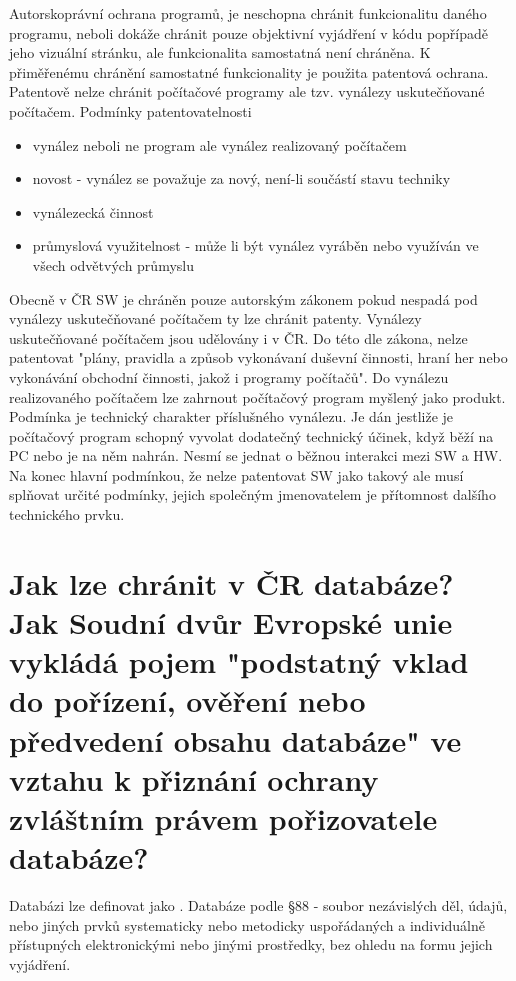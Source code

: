 Autorskoprávní ochrana programů, je neschopna chránit funkcionalitu daného programu, neboli dokáže chránit pouze objektivní vyjádření v kódu popřípadě jeho vizuální stránku, ale funkcionalita samostatná není chráněna. K přiměřenému chránění samostatné funkcionality je použita patentová ochrana. Patentově nelze chránit počítačové programy ale tzv. vynálezy uskutečňované počítačem.\vspace{0.5cm}\newline
Podmínky patentovatelnosti
\begin{itemize}[noitemsep]
    \setlength\itemsep{0em}
    \item  vynález neboli ne program ale vynález realizovaný počítačem
    \item novost - vynález se považuje za nový, není-li součástí stavu techniky
    \item vynálezecká činnost
    \item průmyslová využitelnost - může li být vynález vyráběn nebo využíván ve všech odvětvých průmyslu
\end{itemize}
Obecně v ČR SW je chráněn pouze autorským zákonem pokud nespadá pod vynálezy uskutečňované počítačem ty lze chránit patenty.  
Vynálezy uskutečňované počítačem jsou udělovány i v ČR. Do této dle zákona, nelze patentovat "plány, pravidla a způsob vykonávaní duševní činnosti, hraní her nebo vykonávání obchodní činnosti, jakož i programy počítačů".
Do vynálezu realizovaného počítačem lze zahrnout počítačový program myšlený jako produkt. Podmínka je technický charakter příslušného vynálezu. Je dán jestliže je počítačový program schopný vyvolat dodatečný technický účinek, když běží na PC nebo je na něm nahrán. Nesmí se jednat o běžnou interakci mezi SW a HW.  
Na konec hlavní podmínkou, že nelze patentovat SW jako takový ale musí splňovat určité podmínky, jejich společným jmenovatelem je přítomnost dalšího technického prvku. 


\vspace{0.5cm} 
\section{Jak lze chránit v ČR databáze? Jak Soudní dvůr Evropské unie vykládá pojem "podstatný vklad do pořízení, ověření nebo předvedení obsahu databáze" ve vztahu k přiznání ochrany zvláštním právem pořizovatele databáze?}

Databázi lze definovat jako .\newline
Databáze podle §88 - soubor nezávislých děl, údajů, nebo jiných prvků systematicky nebo metodicky uspořádaných a individuálně přístupných elektronickými nebo jinými prostředky, bez ohledu na formu jejich vyjádření.

